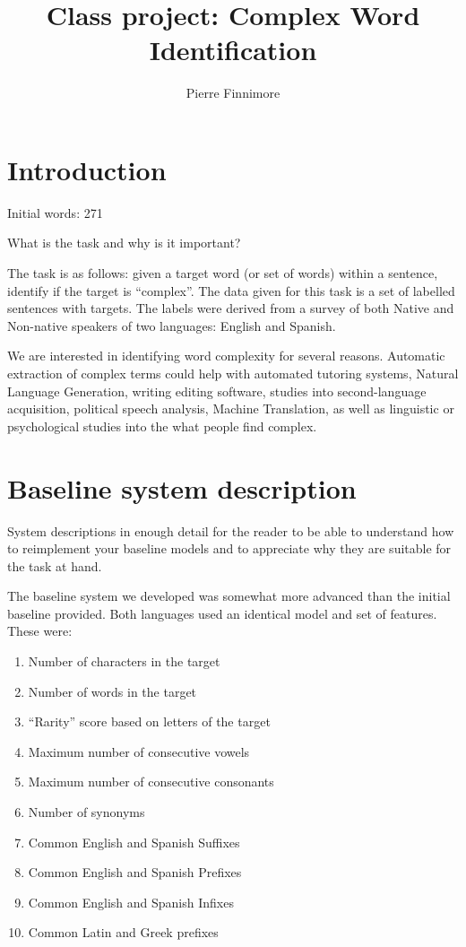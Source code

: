 \documentclass[11pt,a4paper]{article}
\title{Class project: Complex Word Identification}
\author{Pierre Finnimore}
\date{}
\begin{document}
\maketitle
\begin{abstract}

\end{abstract}

\section{Introduction}

Initial words: 271

What is the task and why is it important?

The task is as follows: given a target word (or set of words) within a sentence, identify if the target is \enquote{complex}. The data given for this task is a set of labelled sentences with targets. The labels were derived from a survey of both Native and Non-native speakers of two languages: English and Spanish.

We are interested in identifying word complexity for several reasons. Automatic extraction of complex terms could help with automated tutoring systems, Natural Language Generation, writing editing software, studies into second-language acquisition, political speech analysis, Machine Translation, as well as linguistic or psychological studies into the what people find complex. 

\section{Baseline system description}

System descriptions in enough detail for the reader to be able to understand how to reimplement your baseline models and to appreciate why they are suitable for the task at hand.

The baseline system we developed was somewhat more advanced than the initial baseline provided. Both languages used an identical model and set of features. These were:

\begin{enumerate}
\item Number of characters in the target
\item Number of words in the target
\item \enquote{Rarity} score based on letters of the target
\item Maximum number of consecutive vowels
\item Maximum number of consecutive consonants
\item Number of synonyms
\item Common English and Spanish Suffixes
\item Common English and Spanish Prefixes
\item Common English and Spanish Infixes
\item Common Latin and Greek prefixes
\end{enumerate}
\end{document}
